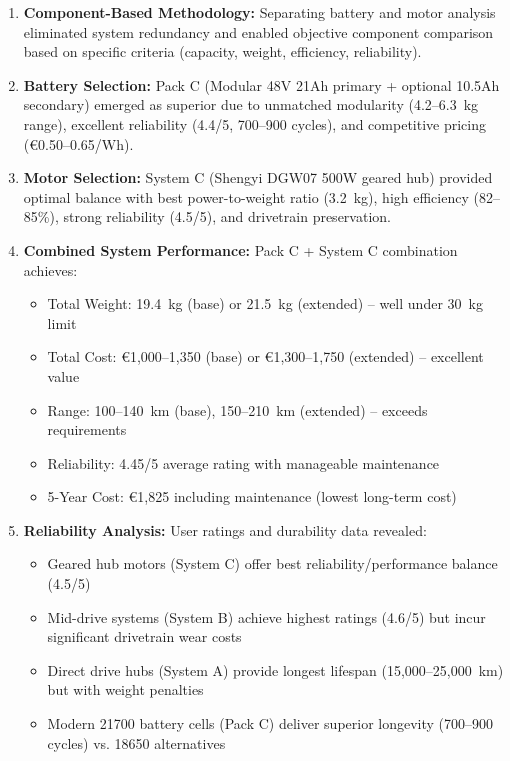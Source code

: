 \documentclass[12pt,a4paper]{article}
\begin{document}
\begin{enumerate}
    \item \textbf{Component-Based Methodology:} Separating battery and motor analysis eliminated system redundancy and enabled objective component comparison based on specific criteria (capacity, weight, efficiency, reliability).
    
    \item \textbf{Battery Selection:} Pack C (Modular 48V 21Ah primary + optional 10.5Ah secondary) emerged as superior due to unmatched modularity (4.2--6.3~kg range), excellent reliability (4.4/5, 700--900 cycles), and competitive pricing (€0.50--0.65/Wh).
    
    \item \textbf{Motor Selection:} System C (Shengyi DGW07 500W geared hub) provided optimal balance with best power-to-weight ratio (3.2~kg), high efficiency (82--85\%), strong reliability (4.5/5), and drivetrain preservation.
    
    \item \textbf{Combined System Performance:} Pack C + System C combination achieves:
    \begin{itemize}
        \item Total Weight: 19.4~kg (base) or 21.5~kg (extended) -- well under 30~kg limit
        \item Total Cost: €1,000--1,350 (base) or €1,300--1,750 (extended) -- excellent value
        \item Range: 100--140~km (base), 150--210~km (extended) -- exceeds requirements
        \item Reliability: 4.45/5 average rating with manageable maintenance
        \item 5-Year Cost: €1,825 including maintenance (lowest long-term cost)
    \end{itemize}
    
    \item \textbf{Reliability Analysis:} User ratings and durability data revealed:
    \begin{itemize}
        \item Geared hub motors (System C) offer best reliability/performance balance (4.5/5)
        \item Mid-drive systems (System B) achieve highest ratings (4.6/5) but incur significant drivetrain wear costs
        \item Direct drive hubs (System A) provide longest lifespan (15,000--25,000~km) but with weight penalties
        \item Modern 21700 battery cells (Pack C) deliver superior longevity (700--900 cycles) vs. 18650 alternatives
    \end{itemize}
    

\end{enumerate}
\end{document}
